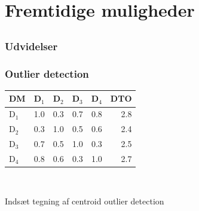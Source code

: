 \documentclass[xcolor=table]{beamer}
\begin{document}
\section{Fremtidige muligheder}

\subsection*{}

\begin{frame}

  \frametitle{Udvidelser}

\end{frame}

\begin{frame}

  \frametitle{Outlier detection}

  \begin{multicols}{2}
    {\scriptsize
    \begin{tabular}{|l|r|r|r|r|r|}
      \hline
      DM    & D$_1$ & D$_2$ & D$_3$ & D$_4$ & DTO \\
      \hline
      D$_1$ &   1.0 &   0.3 &   0.7 &   0.8 & 2.8 \\
      \hline
      D$_2$ &   0.3 &   1.0 &   0.5 &   0.6 & 2.4 \\
      \hline
      D$_3$ &   0.7 &   0.5 &   1.0 &   0.3 & 2.5 \\
      \hline
      D$_4$ &   0.8 &   0.6 &   0.3 &   1.0 & 2.7 \\
      \hline
    \end{tabular} \\
    }
    
    \begin{center}
      Inds\ae t tegning af centroid outlier detection
    \end{center}

  \end{multicols}

\end{frame}





\end{document}
